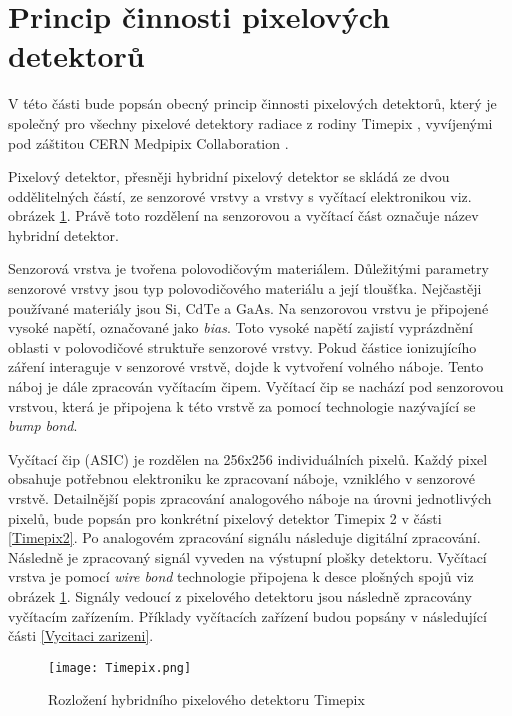 \section{Princip činnosti pixelových detektorů}
\label{kap:2.1}
V této části bude popsán obecný princip činnosti pixelových detektorů, který je společný pro všechny pixelové detektory radiace z rodiny Timepix \cite{Llopart}, vyvíjenými pod záštitou CERN Medpipix Collaboration \cite{Medpix}. 
\par Pixelový detektor, přesněji hybridní pixelový detektor se skládá ze dvou oddělitelných částí, ze senzorové vrstvy a vrstvy s vyčítací elektronikou viz. obrázek \ref{fig:Timepix}. Právě toto rozdělení na senzorovou a vyčítací část označuje název hybridní detektor.
\par Senzorová vrstva je tvořena polovodičovým materiálem. Důležitými parametry senzorové vrstvy jsou typ polovodičového materiálu a její tloušťka. Nejčastěji používané materiály jsou $\text{Si}$, $\text{CdTe}$ a $\text{GaAs}$. Na senzorovou vrstvu je připojené vysoké napětí, označované jako \textit{bias}. Toto vysoké napětí zajistí vyprázdnění oblasti v polovodičové struktuře senzorové vrstvy. Pokud částice ionizujícího záření interaguje v senzorové vrstvě, dojde k vytvoření volného náboje. Tento náboj je dále zpracován vyčítacím čipem. Vyčítací čip se nachází pod senzorovou vrstvou, která je připojena k této vrstvě za pomocí technologie nazývající se \textit{bump bond}.
\par Vyčítací čip (ASIC) je rozdělen na 256x256 individuálních pixelů. Každý pixel obsahuje potřebnou elektroniku ke zpracovaní náboje, vzniklého v senzorové vrstvě. Detailnější popis zpracování analogového náboje na úrovni jednotlivých pixelů, bude popsán pro konkrétní pixelový detektor Timepix 2 v části \ref{Timepix2}. Po analogovém zpracování signálu následuje digitální zpracování. Následně je zpracovaný signál vyveden na výstupní plošky detektoru. Vyčítací vrstva je pomocí \textit{wire bond} technologie připojena k desce plošných spojů viz obrázek \ref{fig:Timepix}. Signály vedoucí z pixelového detektoru jsou následně zpracovány vyčítacím zařízením. Příklady vyčítacích zařízení budou popsány v následující části \ref{Vycitaci zarizeni}.
 \begin{figure}[h!]
 	\centering
 	\captionsetup{justification=centering}
 	\texttt{[image: Timepix.png]}
 	\caption{Rozložení hybridního pixelového detektoru Timepix \cite{Platkevic}} 
 	\label{fig:Timepix}
 \end{figure}	

